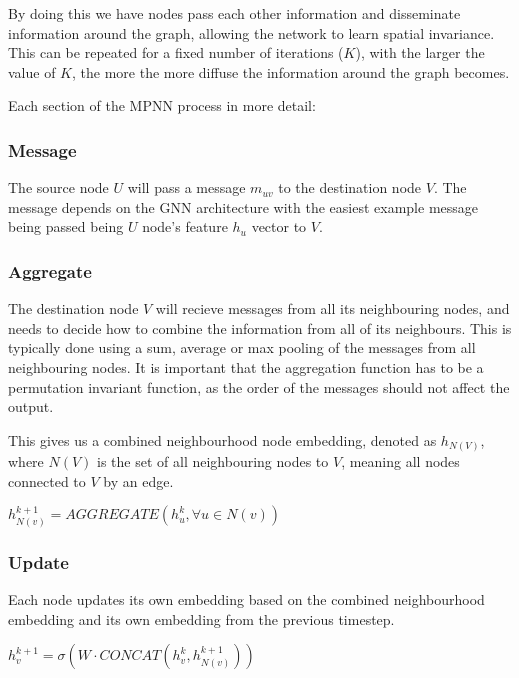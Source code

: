 \documentclass[../main.tex]{subfiles}
\begin{document}
    By doing this we have nodes pass each other information and disseminate information around the graph, allowing the network to learn spatial invariance.  This can be repeated for a fixed number of iterations ($K$), with the larger the value of $K$, the more the more diffuse the information around the graph becomes.

    Each section of the MPNN process in more detail:

    \subsubsection{Message}

    The source node $U$ will pass a message $m_{uv}$ to the destination node $V$. The message depends on the GNN architecture with the easiest example message being passed being $U$ node's feature $h_u$ vector to $V$.

    \subsubsection{Aggregate}

    The destination node $V$ will recieve messages from all its neighbouring nodes, and needs to decide how to combine the information from all of its neighbours. This is typically done using a sum, average or max pooling of the messages from all neighbouring nodes. It is important that the aggregation function has to be a permutation invariant function, as the order of the messages should not affect the output. 

    This gives us a combined neighbourhood node embedding, denoted as $h_{N(V)}$, where $N(V)$ is the set of all neighbouring nodes to $V$, meaning all nodes connected to $V$ by an edge. 

    $h_{N(v)}^{k+1} = AGGREGATE({h_u^k, \forall u \in N(v)})$

    \subsubsection{Update}

    Each node updates its own embedding based on the combined neighbourhood embedding and its own embedding from the previous timestep. 

    $h_v^{k+1} = \sigma(W \cdot CONCAT(h_v^k, h_{N(v)}^{k+1}))$

    
\end{document}
